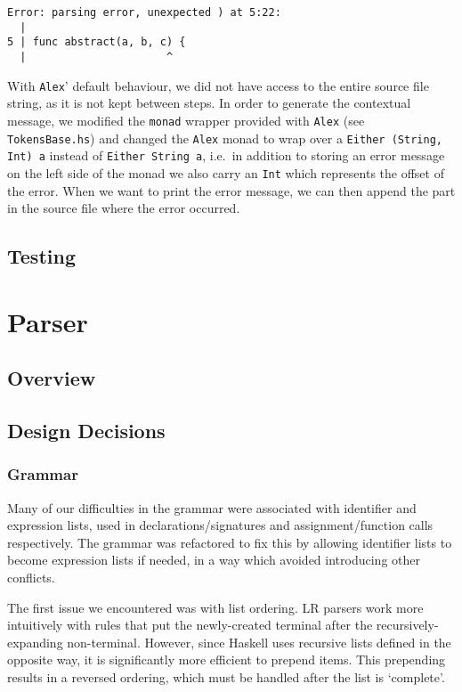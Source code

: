 \documentclass[11pt]{article}
\begin{document}
\begin{verbatim}
Error: parsing error, unexpected ) at 5:22:
  |
5 | func abstract(a, b, c) {
  |                      ^
\end{verbatim}

With \texttt{Alex}' default behaviour, we did not have access to the
entire source file string, as it is not kept between steps. In order
to generate the contextual message, we modified the \texttt{monad}
wrapper provided with \texttt{Alex} (see \texttt{TokensBase.hs}) and
changed the \texttt{Alex} monad to wrap over a \texttt{Either (String,
  Int) a} instead of \texttt{Either String a}, i.e.\ in addition to
storing an error message on the left side of the monad we also carry
an \texttt{Int} which represents the offset of the error. When we want
to print the error message, we can then append the part in the source
file where the error occurred.

\subsection{Testing}
\section{Parser}
\subsection{Overview}
\subsection{Design Decisions}
\subsubsection{Grammar}
Many of our difficulties in the grammar were associated with
identifier and expression lists, used in declarations/signatures and
assignment/function calls respectively. The grammar was refactored to
fix this by allowing identifier lists to become expression lists if
needed, in a way which avoided introducing other conflicts.

The first issue we encountered was with list ordering. LR parsers work
more intuitively with rules that put the newly-created terminal after
the recursively-expanding non-terminal. However, since Haskell uses
recursive lists defined in the opposite way, it is significantly more
efficient to prepend items. This prepending results in a reversed
ordering, which must be handled after the list is `complete'.
\end{document}
